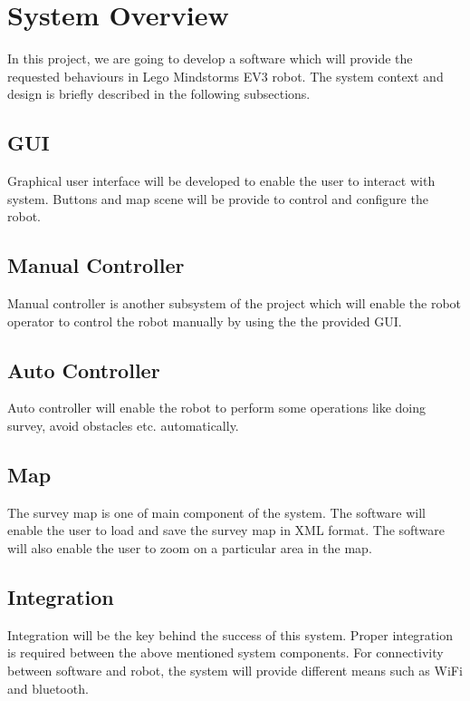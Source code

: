 \section{System Overview}
In this project, we are going to develop a software which will provide the requested behaviours in Lego Mindstorms EV3 robot. The system context and design is briefly described in the following subsections.
\subsection{GUI}
Graphical user interface will be developed to enable the user to interact with system. Buttons and map scene will be provide to control and configure the robot.  
\subsection{Manual Controller}
Manual controller is another subsystem of the project which will enable the robot operator to control the robot manually by using the the provided GUI. 
\subsection{Auto Controller}
Auto controller will enable the robot to perform some operations like doing survey, avoid obstacles etc. automatically. 
\subsection{Map}
The survey map is one of main component of the system. The software will enable the user to load and save the survey map in XML format. The software will also enable the user to zoom on a particular area in the map. 
\subsection{Integration}
Integration will be the key behind the success of this system. Proper integration is required between the above mentioned system components. For connectivity between software and robot, the system will provide different means such as WiFi and bluetooth.  
